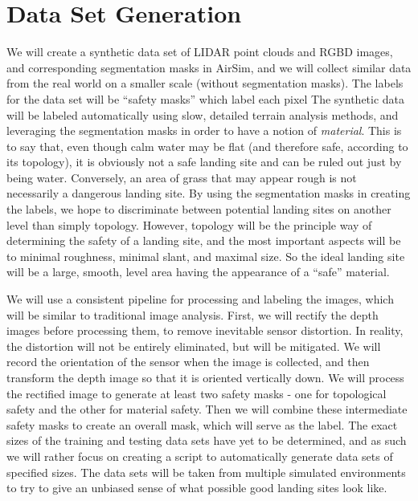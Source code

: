 \section{Data Set Generation}

We will create a synthetic data set of LIDAR point clouds and RGBD images,
and corresponding segmentation masks in AirSim,
and we will collect similar data from the real world on a smaller scale (without segmentation masks).
The labels for the data set will be ``safety masks'' which label each pixel
The synthetic data will be labeled automatically using slow, detailed terrain analysis methods,
and leveraging the segmentation masks in order to have a notion of \textit{material}.
This is to say that, even though calm water may be flat (and therefore safe,
according to its topology),
it is obviously not a safe landing site and can be ruled out just by being water.
Conversely, an area of grass that may appear rough is not necessarily a dangerous landing site.
By using the segmentation masks in creating the labels,
we hope to discriminate between potential landing sites on another level than simply topology.
However, topology will be the principle way of determining the safety of a landing site,
and the most important aspects will be to minimal roughness, minimal slant, and maximal size.
So the ideal landing site will be a large, smooth, level area
having the appearance of a ``safe'' material.

We will use a consistent pipeline for processing and labeling the images,
which will be similar to traditional image analysis.
First, we will rectify the depth images before processing them,
to remove inevitable sensor distortion.
In reality, the distortion will not be entirely eliminated, but will be mitigated.
We will record the orientation of the sensor when the image is collected,
and then transform the depth image so that it is oriented vertically down.
We will process the rectified image to generate at least two safety masks -
one for topological safety and the other for material safety.
Then we will combine these intermediate safety masks to create an overall mask,
which will serve as the label.
The exact sizes of the training and testing data sets have yet to be determined, and as such we will rather focus
on creating a script to automatically generate data sets of specified sizes.
The data sets will be taken from multiple simulated environments to try to give an unbiased
sense of what possible good landing sites look like.


